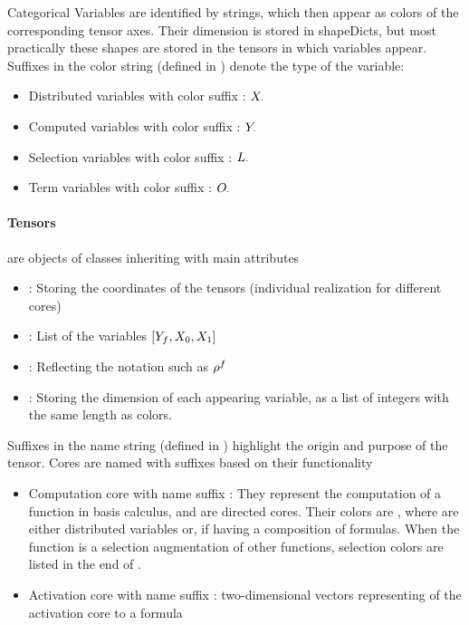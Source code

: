 \subsect{\bncategoricals}
Categorical Variables are identified by strings, which then appear as colors of the corresponding tensor axes.
Their dimension is stored in shapeDicts, but most practically these shapes are stored in the tensors in which variables appear.
Suffixes in the color string (defined in ) denote the type of the variable:
\begin{itemize}
    \item Distributed variables with color suffix \disVarSuf: $X_{\cdot}$
    \item Computed variables with color suffix \comVarSuf: $Y_{\cdot}$
    \item Selection variables with color suffix \selVarSuf: $L_{\cdot}$
    \item Term variables with color suffix \terVarSuf: $O_{\cdot}$
\end{itemize}

\subsect{\bntensors}

\paragraph{Tensors} are objects of classes inheriting  with main attributes
\begin{itemize}
    \item {}: Storing the coordinates of the tensors (individual realization for different cores)
    \item {}: List of the variables $[Y_{f},X_{0},X_{1}]$
    \item {}: Reflecting the notation such as $\rho^{f}$
    \item {}: Storing the dimension of each appearing variable, as a list of integers with the same length as colors.
\end{itemize}

Suffixes in the name string (defined in ) highlight the origin and purpose of the tensor.
Cores are named with suffixes based on their functionality
\begin{itemize}
    \item Computation core with name suffix \comCoreSuf: They represent the computation of a function in basis calculus, and are directed cores.
    Their colors are \inlinecode{[headColors] + [inputColors]}, where \inlinecode{[inputColors]} are either distributed variables or, if having a composition of formulas.
    When the function is a selection augmentation of other functions, selection colors are listed in the end of \inlinecode{[inputColors]}.
    \item Activation core with name suffix \actCoreSuf: two-dimensional vectors representing of the activation core to a formula
\end{itemize}

